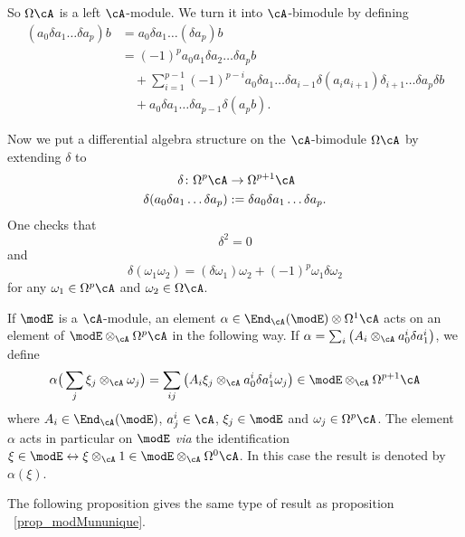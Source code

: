So $\Omega\cA$ is a left $\cA$-module. We turn it into $\cA$-bimodule by defining
\begin{equation}
	\begin{split}
		(a_0\delta a_1\ldots\delta a_p)b&=a_0\delta a_1\ldots(\delta a_p)b\\
		&=(-1)^pa_0a_1\delta a_2\ldots \delta a_p b\\
		&\quad+\sum_{i=1}^{p-1}(-1)^{p-i}a_0 \delta a_1\ldots \delta a_{i-1}\delta(a_ia_{i+1})\delta_{i+1}\ldots\delta a_p\delta b\\
		&\quad+a_0\delta a_1\ldots\delta a_{p-1}\delta(a_pb).
	\end{split}
\end{equation}

Now we put a differential algebra structure on the $\cA$-bimodule $\Omega\cA$ by extending $\delta$ to
\begin{equation}
	\begin{aligned}
		\delta\colon\Omega^p\cA               & \to \Omega^{p+1}\cA                       \\
		\delta(a_0\delta a_1\ldots\delta a_p) & := \delta a_0\delta a_1\ldots \delta a_p.
	\end{aligned}
\end{equation}
One checks that
\[
	\delta^2=0
\]
and
\begin{equation}
	\delta(\omega_1\omega_2)=(\delta\omega_1)\omega_2+(-1)^p\omega_1\delta\omega_2
\end{equation}
for any $\omega_1\in\Omega^p\cA$ and $\omega_2\in\Omega\cA$.

If $\modE$ is a $\cA$-module, an element $\alpha\in\End_{\cA}(\modE)\otimes\Omega^1\cA$ acts on an element of $\modE\otimes_{\cA}\Omega^p\cA$ in the following way. If $\alpha=\sum_i\big( A_i\otimes_{\cA}a^i_0\delta a^i_1 \big)$, we define
\begin{equation}		\label{EqActallphaEOAp}
	\alpha\big( \sum_j\xi_j\otimes_{\cA}\omega_j \big)=\sum_{ij}\big( A_i\xi_j\otimes_{\cA}a^i_0\delta a^i_1\omega_j \big)\in\modE\otimes_{\cA}\Omega^{p+1}\cA
\end{equation}
where $A_i\in\End_{\cA}(\modE)$, $a^i_j\in\cA$, $\xi_j\in\modE$ and $\omega_j\in\Omega^p\cA$. The element $\alpha$ acts in particular on $\modE$ \emph{via} the identification $\xi\in\modE\leftrightarrow\xi\otimes_{\cA}1\in\modE\otimes_{\cA}\Omega^0\cA$. In this case the result is denoted by $\alpha(\xi)$.

The following proposition gives the same type of result as proposition ~\ref{prop_modMununique}.

